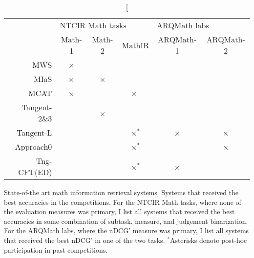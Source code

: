 \begin{table}
\centering
\begin{tabular}{@{}rccccc@{}}
\toprule
             & \multicolumn{3}{l}{NTCIR Math tasks} & \multicolumn{2}{l}{ARQMath labs} \\
             & Math-1 & Math-2 & MathIR             & ARQMath-1 & ARQMath-2            \\
\midrule
MWS          &    ×   &        &                    &           &                      \\
MIaS         &    ×   &    ×   &                    &           &                      \\
MCAT         &    ×   &        &    ×$\phantom{^{\text{*}}}$ &  &                      \\
Tangent-2\&3 &        &    ×   &                    &           &                      \\
Tangent-L    &        &        &    ×$^{\text{*}}$  &    ×      &     ×                \\
Approach0    &        &        &    ×$^{\text{*}}$  &           &     ×                \\
Tng-CFT(ED)  &        &        &    ×$^{\text{*}}$  &    ×      &                      \\
\bottomrule
\end{tabular}
\caption
  [State-of-the art math information retrieval systems]%
  {Systems that received the best accuracies in the competitions.
   For the NTCIR Math tasks, where none of the evaluation measures was
   primary, I list all systems that received the best accuracies in some
   combination of subtask, measure, and judgement binarization. For the ARQMath
   labs, where the nDCG' measure was primary, I list all systems that received
   the best nDCG' in one of the two tasks. $^{\text{*}}$Asterisks denote
   post-hoc participation in past competitions.}
\label{tab:systems}
\end{table}
